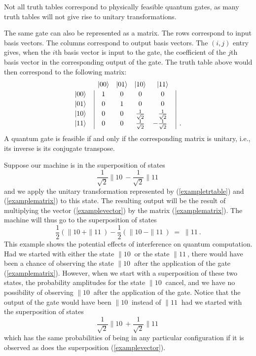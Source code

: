 \vspace{\baselineskip}

\noindent
Not all truth tables correspond to physically feasible quantum gates,
as many truth tables will not give rise to unitary transformations.

The same gate can also be represented as a matrix. The rows correspond
to input basis vectors.  The columns correspond to output basis vectors.
The $(i,j)$ entry gives, when the $i$th basis vector is input to the gate, 
the coefficient of the $j$th basis vector in the corresponding output of 
the gate.  The truth table above would then correspond to the following 
matrix:
\begin{equation}
\begin{array}{c|cccc|l}
\multicolumn{1}{c}{} & \|00\> & \|01\> & \|10\> 
& \multicolumn{1}{c}{\|11\>} & \\*[.5ex]
\|00\> \ \  & 1 & 0 & 0 & 0 & \\*[.5ex]
\|01\> \ \  & 0 & 1 & 0 & 0 & \\*[.5ex]
\|10\> \ \  & 0 & 0 & \frac{1}{\sqrt{2}}  & \frac{1}{\sqrt{2}} & \\*[.5ex]
\|11\> \ \  & 0 & 0 & \frac{1}{\sqrt{2}} & -\frac{1}{\sqrt{2}}\phantom{-} &.
\end{array}
\label{examplematrix}
\end{equation}
A quantum gate is feasible if and only if the corresponding matrix is 
unitary, i.e., its inverse is its conjugate transpose.

Suppose our
machine is in the superposition of states
\begin{equation}
\textstyle
\frac{1}{\sqrt{2}} \|10\> - \frac{1}{\sqrt{2}} \|11\> 
\label{examplevector}
\end{equation}
and we apply the unitary transformation represented
by (\ref{exampletrtable}) and
(\ref{examplematrix}) to this state.  The resulting output will be the
result of multiplying the vector (\ref{examplevector}) by 
the matrix (\ref{examplematrix}).  The machine will thus go to the
superposition of states
\begin{equation}
\textstyle
\frac{1}{2}\left(\|10\> + \|11\>\right) 
-
\frac{1}{2}\left(\|10\> - \|11\>\right) \;=\;
\|11\>.
\end{equation}
This example shows the potential effects of interference on quantum
computation.  Had we started with either the state $\|10\>$ or the
state $\|11\>$, there would have been a chance of observing the
state $\|10\>$ after the application of the gate (\ref{examplematrix}).  
However, when we start with a superposition of these two states, the
probability amplitudes for the state $\|10\>$ cancel, and we have no 
possibility of observing $\|10\>$ after the application of the gate.
Notice that the output of the
gate would have been $\|10\>$ instead of $\|11\>$ had 
we started with the superposition of states
\begin{equation}
\textstyle
\frac{1}{\sqrt{2}} \|10\> + \frac{1}{\sqrt{2}} \|11\> 
\end{equation}
which has the same probabilities of being in any particular configuration
if it is observed as does the superposition (\ref{examplevector}).

